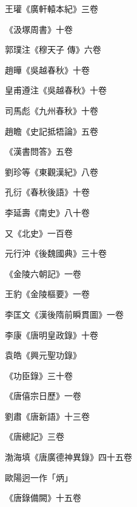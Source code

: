 \begin{pinyinscope}
 王瓘《廣軒轅本紀》三卷



 《汲塚周書》十卷



 郭璞注《穆天子
 傳》六卷



 趙曄《吳越春秋》十卷



 皇甫遵注《吳越春秋》十卷



 司馬彪《九州春秋》十卷



 趙瞻《史記抵牾論》五卷



 《漢書問答》五卷



 劉珍等《東觀漢紀》八卷



 孔衍《春秋後語》十卷



 李延壽《南史》八十卷



 又《北史》一百卷



 元行沖《後魏國典》三十卷



 《金陵六朝記》一卷



 王豹《金陵樞要》一卷



 李匡文《漢後隋前瞬貫圖》一卷



 李康《唐明皇政錄》十卷



 袁皓《興元聖功錄》



 《功臣錄》三十卷



 《唐僖宗日歷》一卷



 劉肅《唐新語》十三卷



 《唐總記》三卷



 渤海填《唐廣德神異錄》四十五卷



 歐陽迥一作「炳」



 《唐錄備闕》十五卷




\end{pinyinscope}
